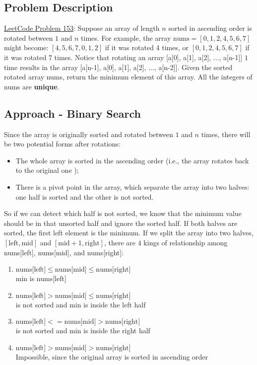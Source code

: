 \documentclass[justified]{tufte-book}
\begin{document}
\subsection{Problem Description}
\href{https://leetcode.com/problems/find-minimum-in-rotated-sorted-array/}{LeetCode Problem 153}: Suppose an array of length $n$ sorted in ascending order is rotated between $1$ and $n$ times. For example, the array $\text{nums} = [0,1,2,4,5,6,7]$ might become: $[4,5,6,7,0,1,2]$ if it was rotated 4 times, or $[0,1,2,4,5,6,7]$ if it was rotated 7 times. Notice that rotating an array [a[0], a[1], a[2], ..., a[n-1]] $1$ time results in the array [a[n-1], a[0], a[1], a[2], ..., a[n-2]]. Given the sorted rotated array nums, return the minimum element of this array. All the integers of nums are \textbf{unique}.

\subsection{Approach - Binary Search}
Since the array is originally sorted and rotated between $1$ and $n$ times, there will be two potential forms after rotations:
\begin{itemize}
    \item The whole array is sorted in the ascending order (i.e., the array rotates back to the original one );
    \item There is a pivot point in the array, which separate the array into two halves: one half is sorted and the other is not sorted.
\end{itemize}
So if we can detect which half is not sorted, we know that the minimum value should be in that unsorted half and ignore the sorted half. If both halves are sorted, the first left element is the minimum. If we split the array into two halves, $[\text{left}, \text{mid}]$ and $[\text{mid} + 1, \text{right}]$, there are $4$ kings of relationship among nums[left], nums[mid], and nums[right]:
\begin{enumerate}
    \item $\text{nums[left]} \leq \text{nums[mid]} \leq \text{nums[right]}$ \\
    min is nums[left]
    \item $\text{nums[left]} > \text{nums[mid]} \leq \text{nums[right]}$ \\
     is not sorted and min is inside the left half
    \item $\text{nums[left]} <= \text{nums[mid]} > \text{nums[right]}$ \\
     is not sorted and min is inside the right half
    \item $\text{nums[left]} > \text{nums[mid]} > \text{nums[right]}$ \\
    Impossible, since the original array is sorted in ascending order
\end{enumerate}
\end{document}

